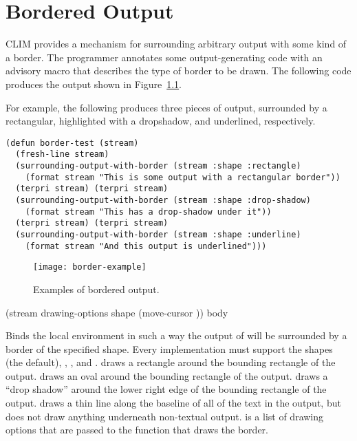 
\chapter {Bordered Output}
\label {bordered-output}

CLIM provides a mechanism for surrounding arbitrary output with some kind of a
border.  The programmer annotates some output-generating code with an advisory
macro that describes the type of border to be drawn.  The following code
produces the output shown in Figure~\ref{border-example}.

For example, the following produces three pieces of output, surrounded by a
rectangular, highlighted with a dropshadow, and underlined, respectively.

\begin{verbatim}
(defun border-test (stream)
  (fresh-line stream)
  (surrounding-output-with-border (stream :shape :rectangle)
    (format stream "This is some output with a rectangular border"))
  (terpri stream) (terpri stream)
  (surrounding-output-with-border (stream :shape :drop-shadow)
    (format stream "This has a drop-shadow under it"))
  (terpri stream) (terpri stream)
  (surrounding-output-with-border (stream :shape :underline)
    (format stream "And this output is underlined")))
\end{verbatim}

\begin{figure}
\centerline{\texttt{[image: border-example]}}
\caption{\label{border-example} Examples of bordered output.}
\end{figure}


 {(\optional stream
                                             \rest drawing-options
                                             \key shape (move-cursor ))
                                            \body body}

Binds the local environment in such a way the output of  will be
surrounded by a border of the specified shape.  Every implementation must
support the shapes  (the default), , ,
and .   draws a rectangle around the bounding
rectangle of the output.   draws an oval around the bounding rectangle
of the output.   draws a ``drop shadow'' around the lower right
edge of the bounding rectangle of the output.   draws a thin line
along the baseline of all of the text in the output, but does not draw anything
underneath non-textual output.   is a list of drawing
options that are passed to the function that draws the border.

